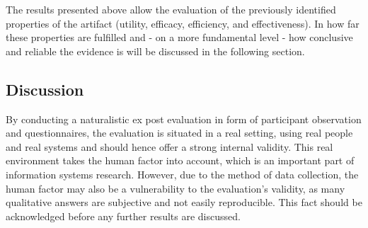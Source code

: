 The results presented above allow the evaluation of the previously identified properties of the artifact (utility, efficacy, efficiency, and effectiveness). In how far these properties are fulfilled and - on a more fundamental level - how conclusive and reliable the evidence is will be discussed in the following section. 

\subsection{Discussion}
By conducting a naturalistic ex post evaluation in form of participant observation and questionnaires, the evaluation is situated in a real setting, using real people and real systems and should hence offer a strong internal validity. This real environment takes the human factor into account, which is an important part of information systems research. However, due to the method of data collection, the human factor may also be a vulnerability to the evaluation's validity, as many qualitative answers are subjective and not easily reproducible. This fact should be acknowledged before any further results are discussed.

